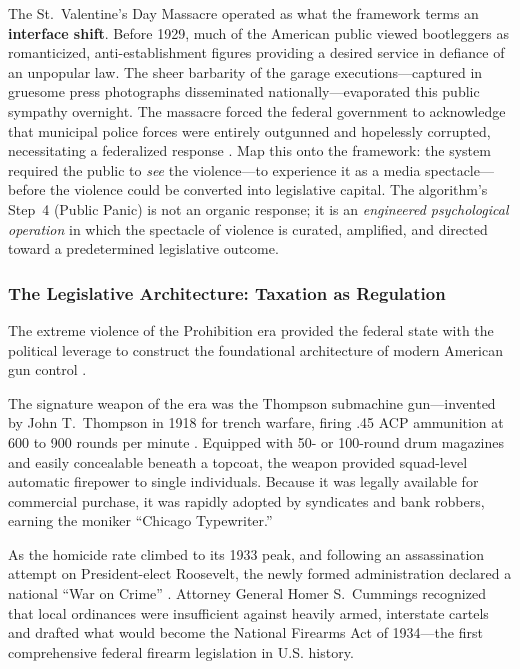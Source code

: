 \documentclass[12pt,openany]{book}
\begin{document}
The St.\ Valentine's Day Massacre operated as what the framework terms an \textbf{interface shift}. Before 1929, much of the American public viewed bootleggers as romanticized, anti-establishment figures providing a desired service in defiance of an unpopular law. The sheer barbarity of the garage executions---captured in gruesome press photographs disseminated nationally---evaporated this public sympathy overnight. The massacre forced the federal government to acknowledge that municipal police forces were entirely outgunned and hopelessly corrupted, necessitating a federalized response \cite{poynter_valentine, natgeo_machinegun}. Map this onto the framework: the system required the public to \textit{see} the violence---to experience it as a media spectacle---before the violence could be converted into legislative capital. The algorithm's Step~4 (Public Panic) is not an organic response; it is an \textit{engineered psychological operation} in which the spectacle of violence is curated, amplified, and directed toward a predetermined legislative outcome.

\subsubsection{The Legislative Architecture: Taxation as Regulation}

The extreme violence of the Prohibition era provided the federal state with the political leverage to construct the foundational architecture of modern American gun control \cite{nfa1934, atf_nfa}.

The signature weapon of the era was the Thompson submachine gun---invented by John T.\ Thompson in 1918 for trench warfare, firing .45 ACP ammunition at 600 to 900 rounds per minute \cite{wikipedia_thompson}. Equipped with 50- or 100-round drum magazines and easily concealable beneath a topcoat, the weapon provided squad-level automatic firepower to single individuals. Because it was legally available for commercial purchase, it was rapidly adopted by syndicates and bank robbers, earning the moniker ``Chicago Typewriter.''

As the homicide rate climbed to its 1933 peak, and following an assassination attempt on President-elect Roosevelt, the newly formed administration declared a national ``War on Crime'' \cite{fbi_gangster, pbs_gangsters}. Attorney General Homer S.\ Cummings recognized that local ordinances were insufficient against heavily armed, interstate cartels and drafted what would become the National Firearms Act of 1934---the first comprehensive federal firearm legislation in U.S. history.
\end{document}

